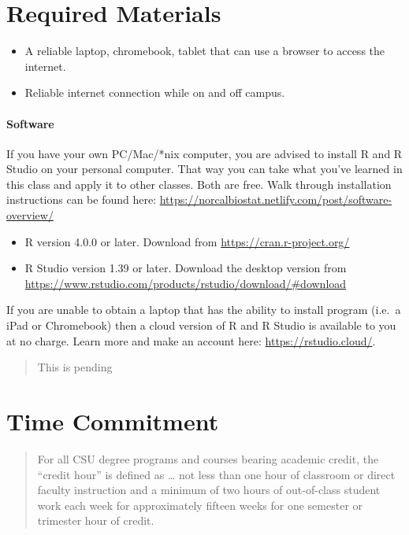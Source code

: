 \documentclass[
  11pt,
]{article}
\providecommand{\tightlist}{%
  \setlength{\itemsep}{0pt}\setlength{\parskip}{0pt}}
\begin{document}
\hypertarget{required-materials}{%
\section{Required Materials}\label{required-materials}}

\begin{itemize}
\tightlist
\item
  A reliable laptop, chromebook, tablet that can use a browser to access
  the internet.
\item
  Reliable internet connection while on and off campus.
\end{itemize}

\hypertarget{software}{%
\paragraph{Software}\label{software}}

If you have your own PC/Mac/*nix computer, you are advised to install R
and R Studio on your personal computer. That way you can take what
you've learned in this class and apply it to other classes. Both are
free. Walk through installation instructions can be found here:
\url{https://norcalbiostat.netlify.com/post/software-overview/}

\begin{itemize}
\tightlist
\item
  R version 4.0.0 or later. Download from
  \url{https://cran.r-project.org/}
\item
  R Studio version 1.39 or later. Download the desktop version from
  \url{https://www.rstudio.com/products/rstudio/download/\#download}
\end{itemize}

If you are unable to obtain a laptop that has the ability to install
program (i.e.~a iPad or Chromebook) then a cloud version of R and R
Studio is available to you at no charge. Learn more and make an account
here: \url{https://rstudio.cloud/}.

\begin{quote}
This is pending
\end{quote}

\hypertarget{time-commitment}{%
\section{Time Commitment}\label{time-commitment}}

\begin{quote}
For all CSU degree programs and courses bearing academic credit, the
``credit hour'' is defined as \ldots{} not less than one hour of
classroom or direct faculty instruction and a minimum of two hours of
out-of-class student work each week for approximately fifteen weeks for
one semester or trimester hour of credit.
\end{quote}
\end{document}

